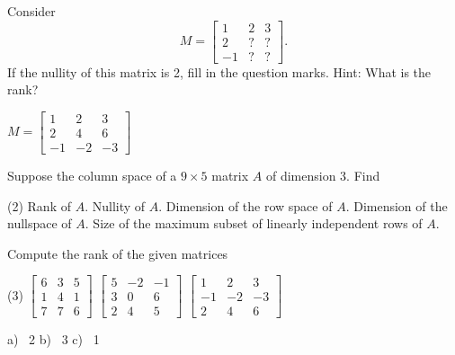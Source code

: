 \begin{exercise}
Consider
\begin{equation*}
M =
\begin{bmatrix}
1 & 2 & 3 \\
2 & ? & ? \\
-1 & ? & ?
\end{bmatrix} .
\end{equation*}
If the nullity of this matrix is 2, fill in the question marks.  Hint: What
is the rank?
\end{exercise}
\comboSol{%
}
{%
$M = \left[\begin{smallmatrix} 1 & 2 & 3 \\ 2 & 4 & 6 \\ -1 & -2 & -3 \end{smallmatrix}\right]$
}

\begin{exercise}\ansMark%
Suppose the column space of a $9 \times 5$ matrix $A$ of dimension 3.  Find
\begin{tasks}(2)
\task
Rank of $A$.
\task
Nullity of $A$.
\task
Dimension of the row space of $A$.
\task
Dimension of the nullspace of $A$.
\task
Size of the maximum subset of
linearly independent rows of $A$.
\end{tasks}
\end{exercise}


\begin{exercise} \label{exercise:rankmatrix}
Compute the rank of the given matrices
\begin{tasks}(3)
\task
$\begin{bmatrix}
6 & 3 & 5 \\
1 & 4 & 1 \\
7 & 7 & 6
\end{bmatrix}$
\task
$\begin{bmatrix}
5 & -2 & -1 \\
3 & 0 & 6 \\
2 & 4 & 5
\end{bmatrix}$
\task
$\begin{bmatrix}
1 & 2 & 3 \\
-1 & -2 & -3 \\
2 & 4 & 6
\end{bmatrix}$
\end{tasks}
\end{exercise}
\comboSol{%
}
{%
a)~ 2 \quad b)~ 3 \quad c)~ 1
}

